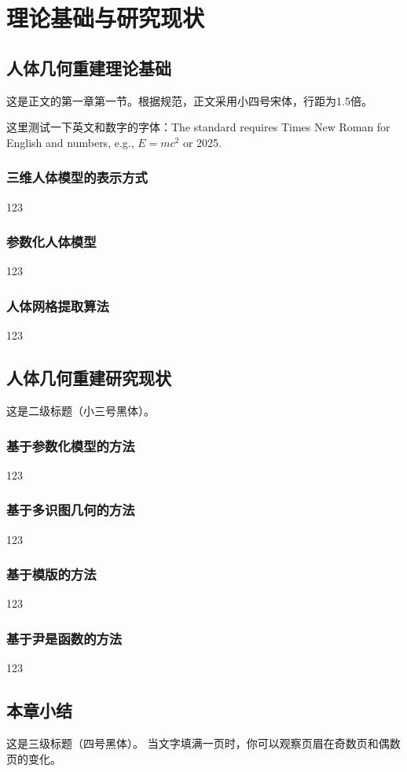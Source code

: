 \chapter{理论基础与研究现状}

\section{人体几何重建理论基础}
这是正文的第一章第一节。根据规范，正文采用小四号宋体，行距为1.5倍。

这里测试一下英文和数字的字体：The standard requires Times New Roman for English and numbers, e.g., $E=mc^2$ or 2025.

\subsection{三维人体模型的表示方式}
123
\subsection{参数化人体模型}
123
\subsection{人体网格提取算法}
123

\section{人体几何重建研究现状}
这是二级标题（小三号黑体）。

\subsection{基于参数化模型的方法}
123
\subsection{基于多识图几何的方法}
123
\subsection{基于模版的方法}
123
\subsection{基于尹是函数的方法}
123

\section{本章小结}
这是三级标题（四号黑体）。
当文字填满一页时，你可以观察页眉在奇数页和偶数页的变化。
